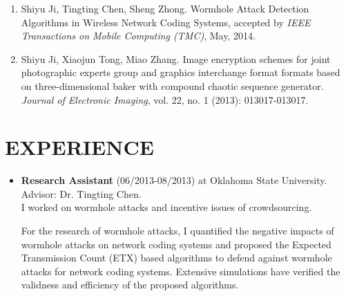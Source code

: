 \documentclass{res}
\begin{document}
\begin{resume}
\begin{enumerate}
\item Shiyu Ji, Tingting Chen, Sheng Zhong. Wormhole Attack Detection Algorithms in Wireless Network Coding Systems, accepted by \emph{IEEE Transactions on Mobile Computing (TMC)}, May, 2014.

\item Shiyu Ji, Xiaojun Tong, Miao Zhang. Image encryption schemes for joint photographic experts group and graphics interchange format formats based on three-dimensional baker with compound chaotic sequence generator. \emph{Journal of Electronic Imaging}, vol. 22, no. 1 (2013): 013017-013017.
\end{enumerate}
\section{EXPERIENCE}
\begin{itemize}
\item \textbf{Research Assistant} (06/2013-08/2013) at Oklahoma State University.\\
Advisor: Dr. Tingting Chen.\\
I worked on wormhole attacks and incentive issues of crowdsourcing.

For the research of wormhole attacks, I quantified the negative impacts of wormhole attacks on network coding systems and proposed the Expected Transmission Count (ETX) based algorithms to defend against wormhole attacks for network coding systems. Extensive simulations have verified the validness and efficiency of the proposed algorithms.


\end{itemize}
\end{resume}
\end{document}
